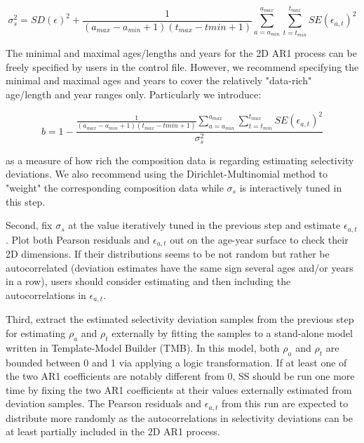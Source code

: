 \begin{equation}
\sigma_s^2=SD(\epsilon)^2+\frac{1}{(a_{max}-a_{min}+1)(t_{max}-t{min}+1)}\sum_{a=a_{min}}^{a_{max}}\sum_{t=t_{min}}^{t_{max}}SE(\epsilon_{a,t})^2
\end{equation}

The minimal and maximal ages/lengths and years for the 2D AR1 process can be freely specified by users in the control file. However, we recommend specifying the minimal and maximal ages and years to cover the relatively "data-rich" age/length and year ranges only. Particularly we introduce: 

\begin{equation}
b=1-\frac{\frac{1}{(a_{max}-a_{min}+1)(t_{max}-t{min}+1)}\sum_{a=a_{min}}^{a_{max}}\sum_{t=t_{min}}^{t_{max}}SE(\epsilon_{a,t})^2}{\sigma_s^2}
\end{equation}

as a measure of how rich the composition data is regarding estimating selectivity deviations. We also recommend using the Dirichlet-Multinomial method to "weight" the corresponding composition data while $\sigma_s$ is interactively tuned in this step.

Second, fix $\sigma_s$ at the value iteratively tuned in the previous step and estimate $\epsilon_{a,t}$. Plot both Pearson residuals and $\epsilon_{a,t}$ out on the age-year surface to check their 2D dimensions. If their distributions seems to be not random but rather be autocorrelated (deviation estimates have the same sign several ages and/or years in a row), users should consider estimating and then including the autocorrelations in $\epsilon_{a,t}$.

Third, extract the estimated selectivity deviation samples from the previous step for estimating $\rho_a$ and $\rho_t$ externally by fitting the samples to a stand-alone model written in Template-Model Builder (TMB). In this model, both $\rho_a$ and $\rho_t$ are bounded between 0 and 1 via applying a logic transformation. If at least one of the two AR1 coefficients are notably different from 0, SS should be run one more time by fixing the two AR1 coefficients at their values externally estimated from deviation samples. The Pearson residuals and $\epsilon_{a,t}$ from this run are expected to distribute more randomly as the  autocorrelations in selectivity deviations can be at least partially included in the 2D AR1 process.



